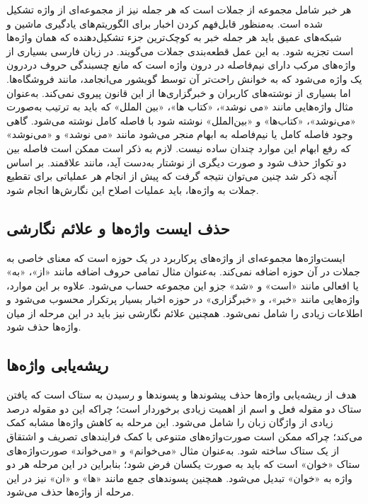 هر خبر شامل مجموعه از جملات است که هر جمله نیز از مجموعه‌ای از واژه تشکیل شده‌ است. به‌منظور قابل‌فهم کردن اخبار برای الگوریتم‌های یادگیری ماشین و شبکه‌های عمیق باید هر جمله خبر به کوچک‌ترین جزء تشکیل‌دهنده که همان واژه‌ها است تجزیه شود. به این عمل قطعه‌بندی جملات می‌گویند. در زبان فارسی بسیاری از واژه‌های مرکب دارای نیم‌فاصله در درون واژه است که مانع چسبندگی حروف دردرون یک واژه می‌شود که به خوانش راحت‌تر آن توسط گویشور می‌انجامد، مانند فروشگاه‌ها. اما بسیاری از نوشته‌های کاربران و خبرگزاری‌ها از این قانون پیروی نمی‌کند. به‌عنوان مثال واژه‌هایی مانند «می نوشد»، «کتاب ها»، «بین الملل» که باید به ترتیب به‌صورت «می‌نوشد»، «کتاب‌ها» و «بین‌الملل» نوشته شود با فاصله کامل نوشته می‌شود. گاهی وجود فاصله کامل یا نیم‌فاصله به ابهام منجر می‌شود مانند «می نوشد» و «می‌نوشد» که رفع ابهام این موارد چندان ساده نیست. لازم به ذکر است ممکن است فاصله بین دو تکواژ حذف شود و صورت دیگری از نوشتار به‌دست آید، مانند علاقمند. بر اساس آنچه ذکر شد چنین می‌توان نتیجه گرفت که پیش از انجام هر عملیاتی برای تقطیع جملات به واژه‌ها، باید عملیات اصلاح این نگارش‌ها انجام شود.

\subsection[حذف ایست‌واژه‌ها و علائم نگارشی]{حذف ایست واژه‌ها و علائم نگارشی}
 ایست‌واژه‌ها مجموعه‌ای از واژه‌های پرکاربرد در یک حوزه است که معنای خاصی به جملات در آن حوزه اضافه نمی‌کند. به‌عنوان مثال تمامی حروف اضافه مانند «از»، «به» یا افعالی مانند «است» و «شد» جزو این مجموعه حساب می‌شود. علاوه بر این موارد، واژه‌هایی مانند «خبر»، و «خبرگزاری» در حوزه اخبار بسیار پرتکرار محسوب می‌شود و اطلاعات زیادی را شامل نمی‌شود. همچنین علائم نگارشی نیز باید در این مرحله از میان واژه‌ها حذف شود.
 
\subsection[ریشه‌یابی واژه‌ها]{ریشه‌یابی واژه‌ها}
هدف از ریشه‌یابی واژه‌ها حذف پیشوندها و پسوندها و رسیدن به ستاک است که یافتن ستاک دو مقوله فعل و اسم از اهمیت زیادی برخوردار است؛ چراکه این دو مقوله درصد زیادی از واژگان زبان را شامل می‌شود. این مرحله به کاهش واژه‌ها مشابه کمک می‌کند؛ چراکه ممکن است صورت‌واژه‌های متنوعی با کمک فرایندهای تصریف و اشتقاق از یک ستاک ساخته شود. به‌عنوان مثال «می‌خوانم» و «می‌خواند» صورت‌واژه‌های ستاک «خوان» است که باید به صورت یکسان فرض شود؛ بنابراین در این مرحله هر دو واژه به «خوان» تبدیل می‌شود. همچنین پسوندهای جمع مانند «ها» و «ان» نیز در این مرحله از واژه‌ها حذف می‌شود.

